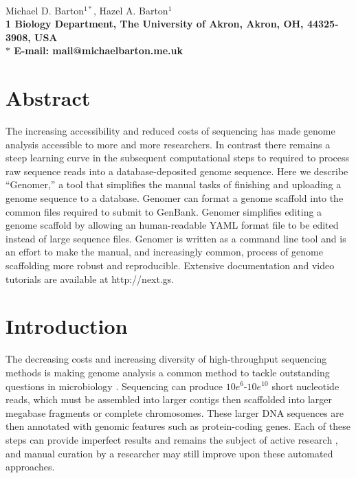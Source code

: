 \documentclass[10pt]{article}
\date{}
\begin{document}
\begin{flushleft}
{\Large
\textbf{}
}
\\
Michael D. Barton$^{1\ast}$, 
Hazel A. Barton$^{1}$
\\
\bf{1} Biology Department, The University of Akron, Akron, OH, 44325-3908, USA
\\
$\ast$ E-mail: mail@michaelbarton.me.uk
\end{flushleft}

\section*{Abstract}

The increasing accessibility and reduced costs of sequencing has made genome
analysis accessible to more and more researchers. In contrast there remains a
steep learning curve in the subsequent computational steps to required to
process raw sequence reads into a database-deposited genome sequence. Here we
describe ``Genomer,'' a tool that simplifies the manual tasks of finishing and
uploading a genome sequence to a database. Genomer can format a genome scaffold
into the common files required to submit to GenBank. Genomer simplifies editing
a genome scaffold by allowing an human-readable YAML format file to be edited
instead of large sequence files. Genomer is written as a command line tool and
is an effort to make the manual, and increasingly common, process of genome
scaffolding more robust and reproducible. Extensive documentation and video
tutorials are available at http://next.gs.

\section*{Introduction}

The decreasing costs and increasing diversity of high-throughput sequencing
methods is making genome analysis a common method to tackle outstanding
questions in microbiology \cite{loman2012b}. Sequencing can produce
$10e^{6}$-$10e^{10}$ short nucleotide reads, which must be assembled into
larger contigs then scaffolded into larger megabase fragments or complete
chromosomes. These larger DNA sequences are then annotated with genomic
features such as protein-coding genes. Each of these steps can provide
imperfect results and remains the subject of active research
\cite{earl2011,quail2012,beckloff2012}, and manual curation by a researcher may
still improve upon these automated approaches.
\end{document}
